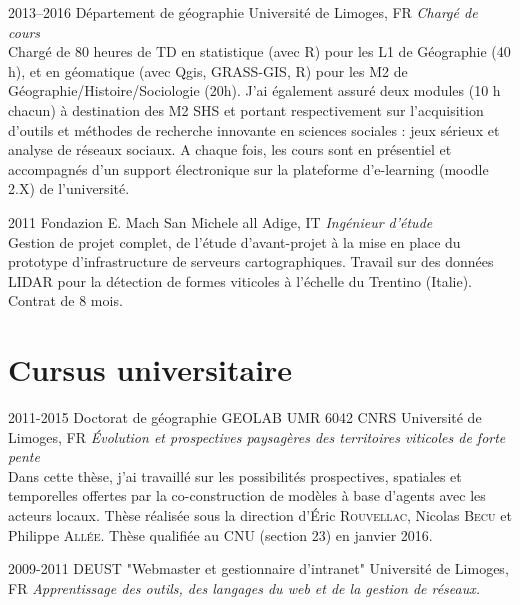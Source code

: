 \documentclass[]{cv-etienne}
\begin{document}
\begin{entrylist}
\entry
{2013--2016}
{Département de géographie}
{Université de Limoges, FR}
{\emph{Chargé de cours} \\
Chargé de 80 heures de TD en statistique (avec R) pour les L1 de Géographie (40 h), et en géomatique (avec Qgis, GRASS-GIS, R) pour les M2 de Géographie/Histoire/Sociologie (20h). J'ai également assuré deux modules (10 h chacun) à destination des M2 SHS et portant respectivement sur l’acquisition d’outils et méthodes de recherche innovante en sciences sociales : jeux sérieux et analyse de réseaux sociaux. A chaque fois, les cours sont en présentiel et accompagnés d'un support électronique sur la plateforme d'e-learning (moodle 2.X) de l'université.
}
\end{entrylist}
\begin{entrylist}
\entry
{2011}
{Fondazion E. Mach}
{San Michele all Adige, IT}
{\emph{Ingénieur d'étude}\\
Gestion de projet complet, de l'étude d'avant-projet à la mise en place du prototype d'infrastructure de serveurs cartographiques. Travail sur des données LIDAR pour la détection de formes viticoles à l'échelle du Trentino (Italie). Contrat de 8 mois.
}
\end{entrylist}
\section{Cursus universitaire}
\begin{entrylist}
\entry
{2011-2015}
{Doctorat de géographie {\normalfont GEOLAB UMR 6042 CNRS}}
{ Université de Limoges, FR}
{\emph{\'Evolution et prospectives paysagères des territoires viticoles de forte pente} \\Dans cette thèse, j'ai travaillé sur les possibilités prospectives, spatiales et temporelles offertes par la co-construction de modèles à base d'agents avec les acteurs locaux. Thèse réalisée sous la direction d'\'Eric \textsc{Rouvellac}, Nicolas \textsc{Becu} et Philippe \textsc{Allée}. Thèse qualifiée au CNU (section 23) en janvier 2016.}
\end{entrylist}

\begin{entrylist}
\entry
{2009-2011}
{DEUST {\normalfont "Webmaster et gestionnaire d’intranet"}}
{Université de Limoges, FR}
{\emph{Apprentissage des outils, des langages du web et de la gestion de réseaux.}}
\end{entrylist}
\end{document}
